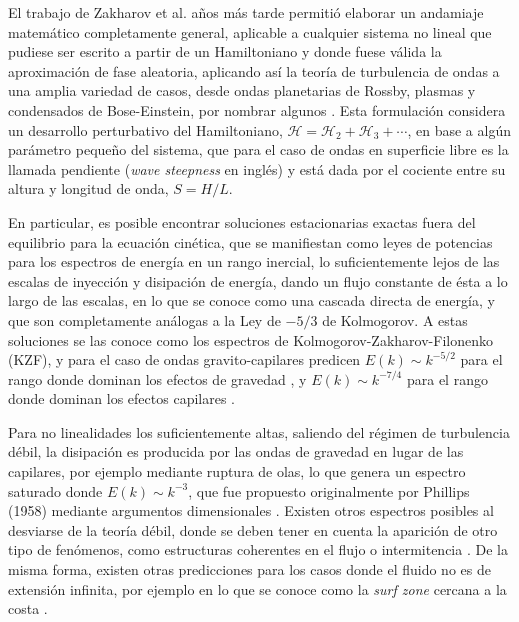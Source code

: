 El trabajo de Zakharov et al. años más tarde permitió elaborar un andamiaje matemático completamente general, aplicable a cualquier sistema no lineal que pudiese ser escrito a partir de un Hamiltoniano \cite{zakharovStatisticalDescriptionNonlinear1975, zakharovKolmogorovSpectraTurbulence1992} y donde fuese válida la aproximación de fase aleatoria, aplicando así la teoría de turbulencia de ondas a una amplia variedad de casos, desde ondas planetarias de Rossby, plasmas y condensados de Bose-Einstein, por nombrar algunos \cite{kartashovaTheoryDiscreteMesoscopic}. Esta formulación  considera un desarrollo perturbativo del Hamiltoniano, $\mathcal{H}=\mathcal{H}_2+\mathcal{H}_3+\cdots$, en base a algún parámetro pequeño del sistema, que para el caso de ondas en superficie libre es la llamada pendiente (\textit{wave steepness} en inglés) y está dada por el cociente entre su altura y longitud de onda, $S=H/L$. 

En particular, es posible encontrar soluciones estacionarias exactas fuera del equilibrio para la ecuación cinética, que se manifiestan como leyes de potencias para los espectros de energía en un rango inercial, lo suficientemente lejos de las escalas de inyección y disipación de energía, dando un flujo constante de ésta a lo largo de las escalas, en lo que se conoce como una cascada directa de energía, y que son completamente análogas a la Ley de $-5/3$ de Kolmogorov. A estas soluciones se las conoce como los espectros de Kolmogorov-Zakharov-Filonenko (KZF), y para el caso de ondas gravito-capilares predicen $E(k)\sim k^{-5/2}$ para el rango donde dominan los efectos de gravedad \cite{zakharovEnergySpectrumStochastic1967}, y $E(k)\sim k^{-7/4}$ para el rango donde dominan los efectos capilares \cite{zakharovWeakTurbulenceCapillary1971}. 

Para no linealidades los suficientemente altas, saliendo del régimen de turbulencia débil, la disipación es  producida por las ondas de gravedad en lugar de las capilares, por ejemplo mediante ruptura de olas, lo que genera un espectro saturado donde $E(k)\sim k^{-3}$, que fue propuesto originalmente por Phillips (1958) mediante argumentos dimensionales \cite{phillipsEquilibriumRangeSpectrum1958}. Existen otros espectros posibles al desviarse de la teoría débil, donde se deben tener en cuenta la aparición de otro tipo de fenómenos, como estructuras coherentes en el flujo o intermitencia \cite{falconLaboratoryExperimentsWave2010, falconExperimentsSurfaceGravity2022}. De la misma forma, existen otras predicciones para los casos donde el fluido no es de extensión infinita, por ejemplo en lo que se conoce como la \textit{surf zone} cercana a la costa \cite{bonnetonTurbulenceTypeBurgers2022}.   

